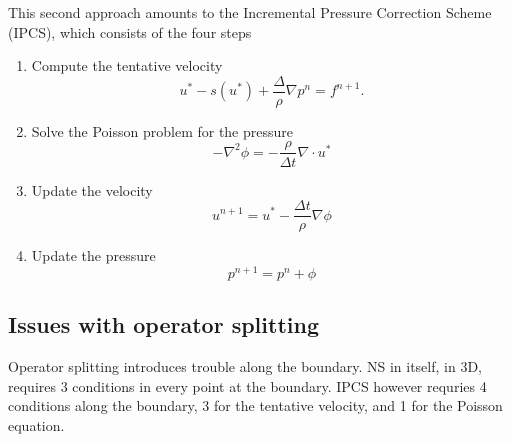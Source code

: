 This second approach amounts to the Incremental Pressure Correction Scheme (IPCS), which consists of the four steps
\begin{enumerate}
    \item Compute the tentative velocity
        \begin{equation}
            u^* - s(u^*) + \frac{\Delta}{\rho}\nabla p^n = f^{n + 1}.
        \end{equation}

    \item Solve the Poisson problem for the pressure
        \begin{equation}
            -\nabla^2 \phi = - \frac{\rho}{\Delta t} \nabla \cdot u^*
        \end{equation}

    \item Update the velocity
        \begin{equation}
            u^{n + 1} = u^* - \frac{\Delta t}{\rho} \nabla \phi
        \end{equation}

    \item Update the pressure
        \begin{equation}
            p^{n + 1} = p^n + \phi
        \end{equation}
\end{enumerate}

\subsection{Issues with operator splitting}
Operator splitting introduces trouble along the boundary.
NS in itself, in 3D, requires 3 conditions in every point at the boundary.
IPCS however requries 4 conditions along the boundary, 3 for the tentative velocity, and 1 for the Poisson equation.

